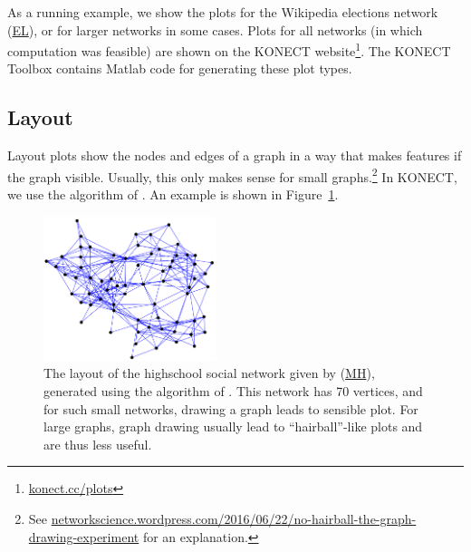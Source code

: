 \documentclass{article}
\newcommand{\wPlot}{0.45\textwidth}
\begin{document}
As a running example, we show the plots for the Wikipedia elections
network
(\href{http://konect.cc/networks/elec/}{\textsf{EL}}), or for larger
networks in some cases.  Plots
for all networks (in which computation was feasible) are shown on the
KONECT
website\footnote{\href{http://konect.cc/plots/}{konect.cc/plots}}. The
KONECT Toolbox contains Matlab code for generating these plot types.

\subsection{Layout}
Layout plots show the nodes and edges of a graph in a way that makes
features if the graph visible.  Usually, this only makes sense for small
graphs.\footnote{See
  \href{https://networkscience.wordpress.com/2016/06/22/no-hairball-the-graph-drawing-experiment/}{networkscience.wordpress.com/2016/06/22/no-hairball-the-graph-drawing-experiment}
  for an explanation.}
In KONECT, we use the algorithm of \cite{b870}.  An
example is shown in Figure~\ref{fig:fruchterman-reingold}.

\begin{figure}
  \centering
  \includegraphics[width=\wPlot]{plot/layout.a.moreno_highschool}
  \caption{
    \label{fig:fruchterman-reingold}
    The layout of the highschool social network given by \cite{konect:coleman}
    (\href{http://konect.cc/networks/moreno_highschool/}{\textsf{MH}}),
    generated using the algorithm of \cite{b870}.  This network has 70 vertices,
    and for such small networks, drawing a graph leads to sensible
    plot.  For large graphs, graph drawing usually lead to
    ``hairball''-like plots and are thus less useful.
  }
\end{figure}
\end{document}
